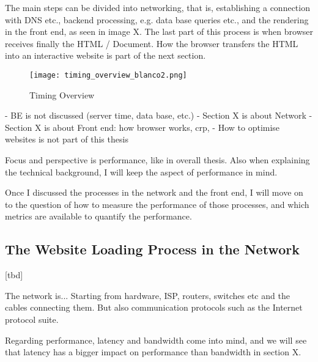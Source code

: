 The main steps can be divided into networking, that is, establishing a connection with DNS etc., backend processing, e.g. data base queries etc., and the rendering in the front end, as seen in image X.
The last part of this process is when browser receives finally the HTML / Document. 
How the browser transfers the HTML into an interactive website is part of the next section.



\begin{figure}[h!]
\begin{center}
\texttt{[image: timing\_overview\_blanco2.png]}
\caption{Timing Overview}
\label{img:timing_overview}
\end{center}
\end{figure}


- BE is not discussed (server time, data base, etc.)
- Section X is about Network
- Section X is about Front end: how browser works, crp, 
- How to optimise websites is not part of this thesis





Focus and perspective is performance, like in overall thesis.
Also when explaining the technical background, I will keep the aspect of performance in mind.

Once I discussed the processes in the network and the front end, I will move on to the question of how to measure the performance of those processes, and which metrics are available to quantify the performance.






\subsection{The Website Loading Process in the Network}

[tbd]

The network is... Starting from hardware, ISP, routers, switches etc and the cables connecting them.
But also communication protocols such as the Internet protocol suite.

Regarding performance, latency and bandwidth come into mind, and we will see that latency has a bigger impact on performance than bandwidth in section X.

